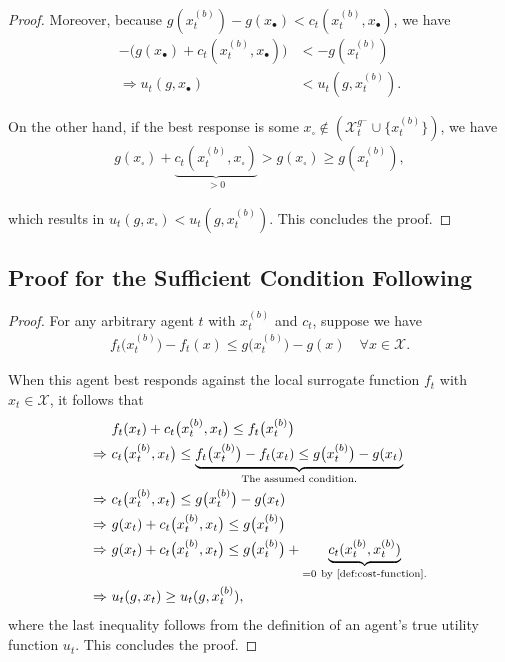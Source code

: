 \begin{proof}
Moreover, because $g(x_t^{(b)}) - g(x_\bullet) < c_t(x_t^{(b)},x_\bullet)$, we have
\begin{align}
-\Big(g(x_\bullet) + c_t(x_t^{(b)},x_\bullet)\Big) &< -g(x_t^{(b)})
\\
\Rightarrow u_t(g,x_\bullet) &< u_t(g,x_t^{(b)}).
\end{align}

On the other hand, if the best response is some $x_\square\not\in(\mathcal{X}_t^{g^{-}}\cup\{x_t^{(b)}\})$, we have
\begin{align}
g(x_\square) + \underbrace{c_t(x_t^{(b)},x_\square)}_{>0} > g(x_\square) \geq g(x_t^{(b)})
,
\end{align}

which results in $u_t(g, x_\square) < u_t(g,x_t^{(b)})$. This concludes the proof.
\end{proof}


\subsection{Proof for the Sufficient Condition Following }

\begin{proof}
For any arbitrary agent $t$ with $x_t^{(b)}$ and $c_t$, suppose we have
\begin{align*}
f_t\big(x_t^{(b)}\big) - f_t(x) \leq g\big(x_t^{(b)}\big) - g(x) \quad \forall x \in \mathcal{X}.
\end{align*}

When this agent best responds against the local surrogate function $f_t$ with $x_t\in\mathcal{X}$, it follows that
\begin{align*}
&f_t(x_t) + c_t\big(x_t^{(b)}, x_t\big) \leq f_t\big(x_t^{(b)}\big)
\\
\Rightarrow\ &c_t\big(x_t^{(b)}, x_t\big) \leq \underbrace{f_t\big(x_t^{(b)}\big) - f_t(x_t)
\leq g\big(x_t^{(b)}\big) - g(x_t)}_\text{The assumed condition.}
\\
\Rightarrow\ &c_t\big(x_t^{(b)}, x_t\big) \leq g\big(x_t^{(b)}\big) - g(x_t)
\\
\Rightarrow\ &g(x_t) + c_t\big(x_t^{(b)}, x_t\big) \leq g\big(x_t^{(b)}\big)
\\
\Rightarrow\ &g(x_t) + c_t\big(x_t^{(b)}, x_t\big) \leq g\big(x_t^{(b)}\big) + \underbrace{c_t(x_t^{(b)},x_t^{(b)})}_{=0\ \text{by \Cref{def:cost-function}}.}
\\
\Rightarrow\ &u_t(g,x_t) \geq u_t(g,x_t^{(b)}),
\end{align*}
where the last inequality follows from the definition of an agent's true utility function $u_t$. This concludes the proof.
\end{proof}





